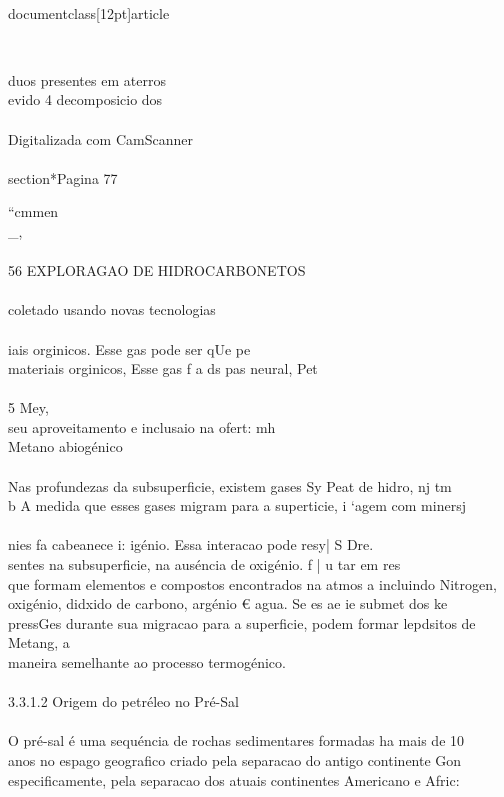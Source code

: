 \\documentclass[12pt]{article}
\begin{document}
\\{duos presentes em aterros\\
evido 4 decomposicio dos\\
\\
Digitalizada com CamScanner\\

\\section*{Pagina 77}

“cmmen \\_,\\
\\
56 EXPLORAGAO DE HIDROCARBONETOS\\
\\
coletado usando novas tecnologias\\
\\
iais orginicos. Esse gas pode ser qUe pe\\
materiais orginicos, Esse gas f a ds pas neural, Pet\\
\\
5 Mey,\\
seu aproveitamento e inclusaio na ofert: mh\\
Metano abiogénico\\
\\
Nas profundezas da subsuperficie, existem gases Sy Peat de hidro, nj tm\\
b A medida que esses gases migram para a superticie, i ‘agem com minersj\\
\\
nies fa cabeanece i: igénio. Essa interacao pode resy| S Dre.\\
sentes na subsuperficie, na auséncia de oxigénio. f | u tar em res\\
que formam elementos e compostos encontrados na atmos a incluindo Nitrogen,\\
oxigénio, didxido de carbono, argénio € agua. Se es ae ie submet dos ke\\
pressGes durante sua migracao para a superficie, podem formar lepdsitos de Metang, a\\
maneira semelhante ao processo termogénico.\\
\\
3.3.1.2 Origem do petréleo no Pré-Sal\\
\\
O pré-sal é uma sequéncia de rochas sedimentares formadas ha mais de 10\\
anos no espago geografico criado pela separacao do antigo continente Gon\\
especificamente, pela separacao dos atuais continentes Americano e Afric:\\
}
\end{document}
